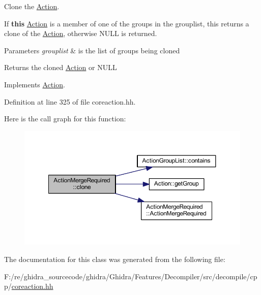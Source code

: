 Clone the \mbox{\hyperlink{class_action}{Action}}. 

If {\bfseries{this}} \mbox{\hyperlink{class_action}{Action}} is a member of one of the groups in the grouplist, this returns a clone of the \mbox{\hyperlink{class_action}{Action}}, otherwise N\+U\+LL is returned. 
\begin{DoxyParams}{Parameters}
{\em grouplist} & is the list of groups being cloned \\
\hline
\end{DoxyParams}
\begin{DoxyReturn}{Returns}
the cloned \mbox{\hyperlink{class_action}{Action}} or N\+U\+LL 
\end{DoxyReturn}


Implements \mbox{\hyperlink{class_action_af8242e41d09e5df52f97df9e65cc626f}{Action}}.



Definition at line 325 of file coreaction.\+hh.

Here is the call graph for this function\+:
\nopagebreak
\begin{figure}[H]
\begin{center}
\leavevmode
\includegraphics[width=350pt]{class_action_merge_required_ab7fa4212557a6a7d32f4f2eab26e08e9_cgraph}
\end{center}
\end{figure}


The documentation for this class was generated from the following file\+:\begin{DoxyCompactItemize}
\item 
F\+:/re/ghidra\+\_\+sourcecode/ghidra/\+Ghidra/\+Features/\+Decompiler/src/decompile/cpp/\mbox{\hyperlink{coreaction_8hh}{coreaction.\+hh}}\end{DoxyCompactItemize}
